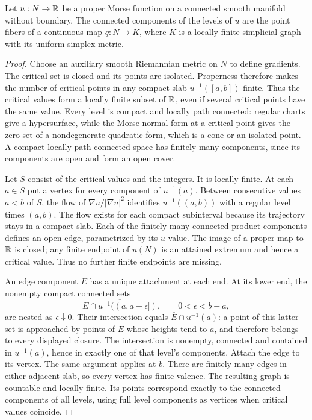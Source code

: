\begin{lemma}
\label{cover:level-quotient}
Let $u:N\to\mathbb R$ be a proper Morse function on a connected smooth
manifold without boundary.  The connected components of the levels of $u$ are the point fibers
of a continuous map $q:N\to K$, where $K$ is a locally finite
simplicial graph with its uniform simplex metric.
\end{lemma}
\begin{proof}
Choose an auxiliary smooth Riemannian metric on $N$ to define gradients.
The critical set is closed and its points are isolated.  Properness
therefore makes the number of critical points in any compact slab
$u^{-1}([a,b])$ finite.  Thus the critical values form a locally finite
subset of $\mathbb R$, even if several critical points have the same value.
Every level is compact and locally path connected: regular charts
give a hypersurface, while the Morse normal form at a critical point
gives the zero set of a nondegenerate quadratic form, which is a cone
or an isolated point.  A compact locally path connected space has finitely
many components, since its components are open and form an open cover.

Let $S$ consist of the critical values and the integers.  It is
locally finite.  At each $a\in S$ put a vertex for every component
of $u^{-1}(a)$.  Between consecutive values $a<b$ of $S$, the flow of
$\nabla u/|\nabla u|^2$ identifies $u^{-1}((a,b))$ with a regular
level times $(a,b)$.  The flow exists for each compact subinterval
because its trajectory stays in a compact slab.  Each of the finitely
many connected product components defines an open edge, parametrized
by its $u$-value.  The image of a proper map to $\mathbb R$ is closed;
any finite endpoint of $u(N)$ is an attained extremum and hence a
critical value.  Thus no further finite endpoints are missing.

An edge component $E$ has a unique attachment at each end.  At its
lower end, the nonempty compact connected sets
\[
 \overline{E\cap u^{-1}((a,a+\epsilon])},
 \qquad 0<\epsilon<b-a,
\]
are nested as $\epsilon\downarrow0$.  Their intersection equals
$\overline E\cap u^{-1}(a)$: a point of this latter set is approached
by points of $E$ whose heights tend to $a$, and therefore belongs
to every displayed closure.  The intersection is nonempty,
connected and contained in $u^{-1}(a)$, hence in exactly one of that
level's components.  Attach the edge to its vertex.  The same argument
applies at $b$.  There are finitely many edges in either adjacent slab,
so every vertex has finite valence.  The resulting graph is countable
and locally finite.  Its points correspond exactly to the connected
components of all levels, using full level components as vertices
when critical values coincide.


\end{proof}
